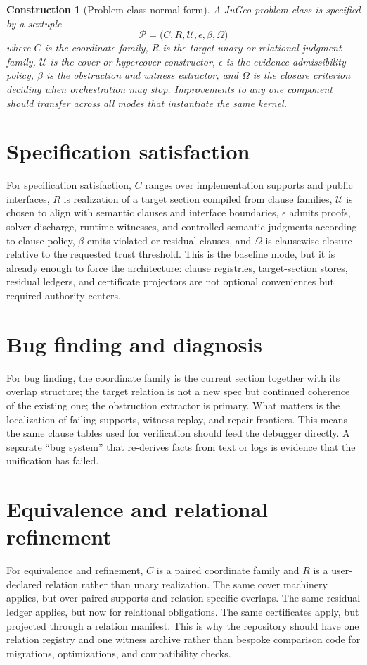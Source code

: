 \documentclass[11pt]{report}
\newtheorem{construction}[definition]{Construction}
\begin{document}
\begin{construction}[Problem-class normal form]
A JuGeo problem class is specified by a sextuple
\[
\mathcal{P}=\bigl(C,R,\mathcal{U},\epsilon,\beta,\Omega\bigr)
\]
where $C$ is the coordinate family, $R$ is the target unary or relational judgment family, $\mathcal{U}$ is the cover or hypercover constructor, $\epsilon$ is the evidence-admissibility policy, $\beta$ is the obstruction and witness extractor, and $\Omega$ is the closure criterion deciding when orchestration may stop. Improvements to any one component should transfer across all modes that instantiate the same kernel.
\end{construction}
\section{Specification satisfaction}
For specification satisfaction, $C$ ranges over implementation supports and public interfaces, $R$ is realization of a target section compiled from clause families, $\mathcal{U}$ is chosen to align with semantic clauses and interface boundaries, $\epsilon$ admits proofs, solver discharge, runtime witnesses, and controlled semantic judgments according to clause policy, $\beta$ emits violated or residual clauses, and $\Omega$ is clausewise closure relative to the requested trust threshold. This is the baseline mode, but it is already enough to force the architecture: clause registries, target-section stores, residual ledgers, and certificate projectors are not optional conveniences but required authority centers.
\section{Bug finding and diagnosis}
For bug finding, the coordinate family is the current section together with its overlap structure; the target relation is not a new spec but continued coherence of the existing one; the obstruction extractor is primary. What matters is the localization of failing supports, witness replay, and repair frontiers. This means the same clause tables used for verification should feed the debugger directly. A separate ``bug system'' that re-derives facts from text or logs is evidence that the unification has failed.
\section{Equivalence and relational refinement}
For equivalence and refinement, $C$ is a paired coordinate family and $R$ is a user-declared relation rather than unary realization. The same cover machinery applies, but over paired supports and relation-specific overlaps. The same residual ledger applies, but now for relational obligations. The same certificates apply, but projected through a relation manifest. This is why the repository should have one relation registry and one witness archive rather than bespoke comparison code for migrations, optimizations, and compatibility checks.
\end{document}
